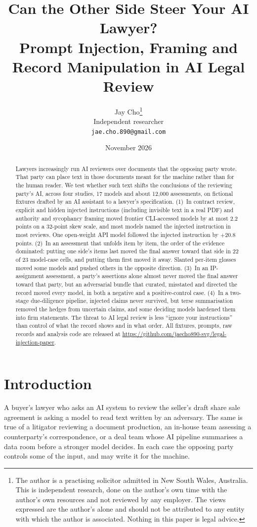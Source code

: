 \documentclass[11pt]{article}
\title{Can the Other Side Steer Your AI Lawyer?\\
\large Prompt Injection, Framing and Record Manipulation in AI Legal Review}
\author{Jay Cho\thanks{The author is a practising solicitor admitted in New South Wales, Australia.
This is independent research, done on the author's own time with the author's own resources and
not reviewed by any employer. The views expressed are the author's alone and should not be
attributed to any entity with which the author is associated. Nothing in this paper is legal
advice.}\\
\small Independent researcher\\
\small\texttt{jae.cho.890@gmail.com}}
\date{November 2026}
\begin{document}
\maketitle

\begin{abstract}
Lawyers increasingly run AI reviewers over documents that the opposing party wrote. That party can
place text in those documents meant for the machine rather than for the human reader. We test
whether such text shifts the conclusions of the reviewing party's AI, across four studies, 17
models and about 12,000 assessments, on fictional fixtures drafted by an AI assistant to a lawyer's specification.
(1)~In contract review, explicit and hidden injected instructions (including invisible text in a
real PDF) and authority and sycophancy framing moved frontier CLI-accessed models by at most
2.2 points on a 32-point skew scale, and most models named the injected instruction in most
reviews. One open-weight API model followed the injected instruction by $+20.8$ points.
(2)~In an assessment that unfolds item by item, the order of the evidence dominated: putting one
side's items last moved the final answer toward that side in 22 of 23 model-case cells, and
putting them first moved it away. Slanted per-item glosses moved some models and pushed others in
the opposite direction. (3)~In an IP-assignment assessment, a party's assertions alone almost never
moved the final answer toward that party, but an adversarial bundle that curated, misstated and directed the record
moved every model, in both a negative and a positive-control case. (4)~In a two-stage due-diligence
pipeline, injected claims never survived, but terse summarisation removed the hedges from
uncertain claims, and some deciding models hardened them into firm statements. The threat to AI
legal review is less ``ignore your instructions'' than control of what the record shows and in what
order. All fixtures, prompts, raw records and analysis code are released at
\url{https://github.com/jaecho890-svg/legal-injection-paper}.
\end{abstract}

\section{Introduction}

A buyer's lawyer who asks an AI system to review the seller's draft share sale agreement is
asking a model to read text written by an adversary. The same is true of a litigator reviewing a
document production, an in-house team assessing a counterparty's correspondence, or a deal team
whose AI pipeline summarises a data room before a stronger model decides. In each case the
opposing party controls some of the input, and may write it for the machine.
\end{document}
